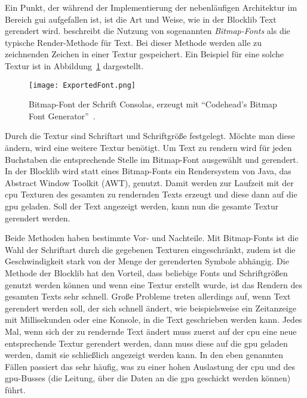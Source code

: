 Ein Punkt, der während der Implementierung der nebenläufigen Architektur im Bereich \ac{gui} aufgefallen ist, ist die Art und Weise, wie in der Blocklib Text gerendert wird. \textcite{Vries2020} beschreibt die Nutzung von sogenannten \emph{Bitmap-Fonts} als die typische Render-Methode für Text. Bei dieser Methode werden alle zu zeichnenden Zeichen in einer Textur gespeichert. Ein Beispiel für eine solche Textur ist in Abbildung~\ref{fig:bitmapfont} dargestellt.
\begin{figure}[!htbp]
	\centering
	\texttt{[image: ExportedFont.png]}
	\caption[Bitmap-Font der Schrift Consolas.]{Bitmap-Font der Schrift Consolas, erzeugt mit \enquote{Codehead's Bitmap Font Generator}~\cite{Codehead2015}.}\label{fig:bitmapfont}
\end{figure}
Durch die Textur sind Schriftart und Schriftgröße festgelegt. Möchte man diese ändern, wird eine weitere Textur benötigt. Um Text zu rendern wird für jeden Buchstaben die entsprechende Stelle im Bitmap-Font ausgewählt und gerendert. In der Blocklib wird statt eines Bitmap-Fonts ein Rendersystem von Java, das Abstract Window Toolkit (AWT), genutzt. Damit werden zur Laufzeit mit der \ac{cpu} Texturen des gesamten zu rendernden Texts erzeugt und diese dann auf die \ac{gpu} geladen. Soll der Text angezeigt werden, kann nun die gesamte Textur gerendert werden.

Beide Methoden haben bestimmte Vor- und Nachteile. Mit Bitmap-Fonts ist die Wahl der Schriftart durch die gegebenen Texturen eingeschränkt, zudem ist die Geschwindigkeit stark von der Menge der gerenderten Symbole abhängig. Die Methode der Blocklib hat den Vorteil, dass beliebige Fonts und Schriftgrößen genutzt werden können und wenn eine Textur erstellt wurde, ist das Rendern des gesamten Texts sehr schnell. Große Probleme treten allerdings auf, wenn Text gerendert werden soll, der sich schnell ändert, wie beispielsweise ein Zeitanzeige mit Millisekunden oder eine Konsole, in die Text geschrieben werden kann. Jedes Mal, wenn sich der zu rendernde Text ändert muss zuerst auf der \ac{cpu} eine neue entsprechende Textur gerendert werden, dann muss diese auf die \ac{gpu} geladen werden, damit sie schließlich angezeigt werden kann. In den eben genannten Fällen passiert das sehr häufig, was zu einer hohen Auslastung der \ac{cpu} und des \ac{gpu}-Busses (die Leitung, über die Daten an die \ac{gpu} geschickt werden können) führt.


